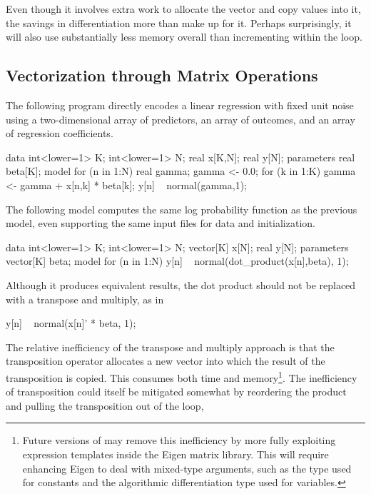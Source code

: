 Even though it involves extra work to allocate the 
vector and copy  values into it, the savings in
differentiation more than make up for it.  Perhaps surprisingly,
it will also use substantially less memory overall than incrementing
 within the loop.


\subsection{Vectorization through Matrix Operations}

The following program directly encodes a linear regression with fixed
unit noise using a two-dimensional array  of predictors, an
array  of outcomes, and an array  of regression
coefficients.
%
\begin{stancode}
data {
  int<lower=1> K;
  int<lower=1> N;
  real x[K,N];
  real y[N];
}
parameters {
  real beta[K];
}
model {
  for (n in 1:N) {
    real gamma;  
    gamma <- 0.0;
    for (k in 1:K)
      gamma <- gamma + x[n,k] * beta[k];
    y[n] ~ normal(gamma,1);
  }
}
\end{stancode}
%
The following model computes the same log probability function as the
previous model, even supporting the same input files for data and
initialization.
%
\begin{stancode}
data {
  int<lower=1> K;
  int<lower=1> N;
  vector[K] x[N];
  real y[N];
}
parameters {
  vector[K] beta;
}
model {
  for (n in 1:N)
    y[n] ~ normal(dot_product(x[n],beta), 1);
}
\end{stancode}
%
Although it produces equivalent results, the dot product should not be
replaced with a transpose and multiply, as in
%
\begin{stancode}
        y[n] ~ normal(x[n]' * beta, 1);
\end{stancode}
%
The relative inefficiency of the transpose and multiply approach is
that the transposition operator allocates a new vector into which the
result of the transposition is copied.  This consumes both time
and memory\footnote{Future versions of \Stan may remove this inefficiency
by more fully exploiting expression templates inside the Eigen
\Cpp matrix library.  This will require enhancing Eigen to deal
with mixed-type arguments, such as the type  used
for constants and the algorithmic differentiation type
used for variables.}.
%
The inefficiency of transposition could itself be mitigated somewhat by
reordering the product and pulling the transposition out of the loop,
